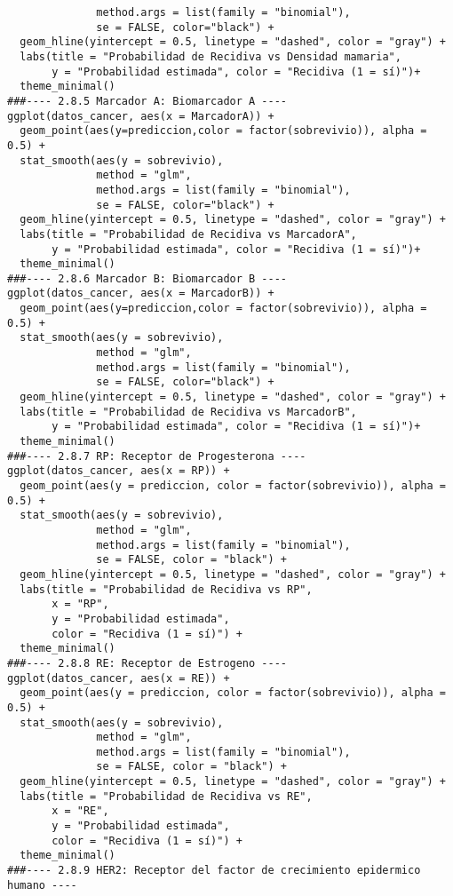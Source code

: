 \documentclass[12pt]{article}
\begin{document}
\begin{verbatim}
              method.args = list(family = "binomial"), 
              se = FALSE, color="black") +  
  geom_hline(yintercept = 0.5, linetype = "dashed", color = "gray") +
  labs(title = "Probabilidad de Recidiva vs Densidad mamaria",
       y = "Probabilidad estimada", color = "Recidiva (1 = sí)")+ 
  theme_minimal()
###---- 2.8.5 Marcador A: Biomarcador A ----
ggplot(datos_cancer, aes(x = MarcadorA)) +
  geom_point(aes(y=prediccion,color = factor(sobrevivio)), alpha = 0.5) +     
  stat_smooth(aes(y = sobrevivio),
              method = "glm",
              method.args = list(family = "binomial"), 
              se = FALSE, color="black") +  
  geom_hline(yintercept = 0.5, linetype = "dashed", color = "gray") +
  labs(title = "Probabilidad de Recidiva vs MarcadorA",
       y = "Probabilidad estimada", color = "Recidiva (1 = sí)")+ 
  theme_minimal()
###---- 2.8.6 Marcador B: Biomarcador B ----
ggplot(datos_cancer, aes(x = MarcadorB)) +
  geom_point(aes(y=prediccion,color = factor(sobrevivio)), alpha = 0.5) +     
  stat_smooth(aes(y = sobrevivio),
              method = "glm",
              method.args = list(family = "binomial"), 
              se = FALSE, color="black") +  
  geom_hline(yintercept = 0.5, linetype = "dashed", color = "gray") +
  labs(title = "Probabilidad de Recidiva vs MarcadorB",
       y = "Probabilidad estimada", color = "Recidiva (1 = sí)")+ 
  theme_minimal()
###---- 2.8.7 RP: Receptor de Progesterona ----
ggplot(datos_cancer, aes(x = RP)) +
  geom_point(aes(y = prediccion, color = factor(sobrevivio)), alpha = 0.5) +     
  stat_smooth(aes(y = sobrevivio),
              method = "glm",
              method.args = list(family = "binomial"), 
              se = FALSE, color = "black") +  
  geom_hline(yintercept = 0.5, linetype = "dashed", color = "gray") +
  labs(title = "Probabilidad de Recidiva vs RP",
       x = "RP",
       y = "Probabilidad estimada",
       color = "Recidiva (1 = sí)") + 
  theme_minimal()
###---- 2.8.8 RE: Receptor de Estrogeno ----
ggplot(datos_cancer, aes(x = RE)) +
  geom_point(aes(y = prediccion, color = factor(sobrevivio)), alpha = 0.5) +     
  stat_smooth(aes(y = sobrevivio),
              method = "glm",
              method.args = list(family = "binomial"), 
              se = FALSE, color = "black") +  
  geom_hline(yintercept = 0.5, linetype = "dashed", color = "gray") +
  labs(title = "Probabilidad de Recidiva vs RE",
       x = "RE",
       y = "Probabilidad estimada",
       color = "Recidiva (1 = sí)") + 
  theme_minimal()
###---- 2.8.9 HER2: Receptor del factor de crecimiento epidermico humano ----

\end{verbatim}
\end{document}
